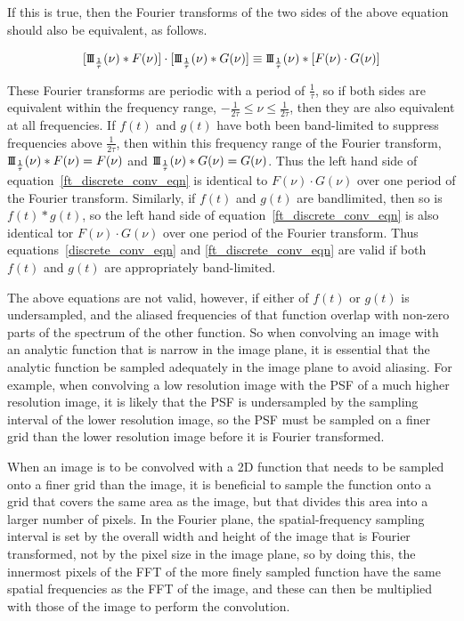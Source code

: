 \documentclass[12pt,twoside,a4paper]{article}
\newcommand{\sha}{\mbox{\small I\!I\!I}}
\begin{document}
If this is true, then the Fourier transforms of the two sides of the
above equation should also be equivalent, as follows.

\begin{equation}
\label{ft_discrete_conv_eqn}
[\sha_{\frac{1}{\tau}}(\nu)\ast F(\nu)] \cdot [\sha_{\frac{1}{\tau}}(\nu)\ast
   G(\nu)] \equiv \sha_{\frac{1}{\tau}}(\nu)\ast [F(\nu) \cdot
  G(\nu)]
\end{equation}

These Fourier transforms are periodic with a period of
$\frac{1}{\tau}$, so if both sides are equivalent within the frequency
range, $-\frac{1}{2\tau}\leq\nu\leq\frac{1}{2\tau}$, then they are
also equivalent at all frequencies. If $f(t)$ and $g(t)$ have both
been band-limited to suppress frequencies above $\frac{1}{2\tau}$,
then within this frequency range of the Fourier transform,
$\sha_{\frac{1}{\tau}}(\nu)\ast F(\nu) = F(\nu)$ and
$\sha_{\frac{1}{\tau}}(\nu)\ast G(\nu) = G(\nu)$. Thus the left hand
side of equation~\ref{ft_discrete_conv_eqn} is identical to $F(\nu)\cdot
G(\nu)$ over one period of the Fourier transform. Similarly, if $f(t)$
and $g(t)$ are bandlimited, then so is $f(t)\ast g(t)$, so the left
hand side of equation~\ref{ft_discrete_conv_eqn} is also identical tor
$F(\nu)\cdot G(\nu)$ over one period of the Fourier transform. Thus
equations~\ref{discrete_conv_eqn} and \ref{ft_discrete_conv_eqn} are valid if
both $f(t)$ and $g(t)$ are appropriately band-limited.

The above equations are not valid, however, if either of $f(t)$ or
$g(t)$ is undersampled, and the aliased frequencies of that function
overlap with non-zero parts of the spectrum of the other function. So
when convolving an image with an analytic function that is narrow in
the image plane, it is essential that the analytic function be sampled
adequately in the image plane to avoid aliasing. For example, when
convolving a low resolution image with the PSF of a much higher
resolution image, it is likely that the PSF is undersampled by the
sampling interval of the lower resolution image, so the PSF must be
sampled on a finer grid than the lower resolution image before it is
Fourier transformed.

When an image is to be convolved with a 2D function that needs to be
sampled onto a finer grid than the image, it is beneficial to sample
the function onto a grid that covers the same area as the image, but
that divides this area into a larger number of pixels. In the Fourier
plane, the spatial-frequency sampling interval is set by the overall
width and height of the image that is Fourier transformed, not by the
pixel size in the image plane, so by doing this, the innermost pixels
of the FFT of the more finely sampled function have the same spatial
frequencies as the FFT of the image, and these can then be multiplied
with those of the image to perform the convolution.
\end{document}
